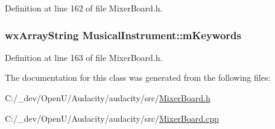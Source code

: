 Definition at line 162 of file Mixer\+Board.\+h.

\subsubsection[{\texorpdfstring{m\+Keywords}{mKeywords}}]{\setlength{\rightskip}{0pt plus 5cm}wx\+Array\+String Musical\+Instrument\+::m\+Keywords}\hypertarget{class_musical_instrument_acdfb0acd48788b3a402ae347b1367a9b}{}\label{class_musical_instrument_acdfb0acd48788b3a402ae347b1367a9b}


Definition at line 163 of file Mixer\+Board.\+h.



The documentation for this class was generated from the following files\+:\begin{DoxyCompactItemize}
\item 
C\+:/\+\_\+dev/\+Open\+U/\+Audacity/audacity/src/\hyperlink{_mixer_board_8h}{Mixer\+Board.\+h}\item 
C\+:/\+\_\+dev/\+Open\+U/\+Audacity/audacity/src/\hyperlink{_mixer_board_8cpp}{Mixer\+Board.\+cpp}\end{DoxyCompactItemize}
